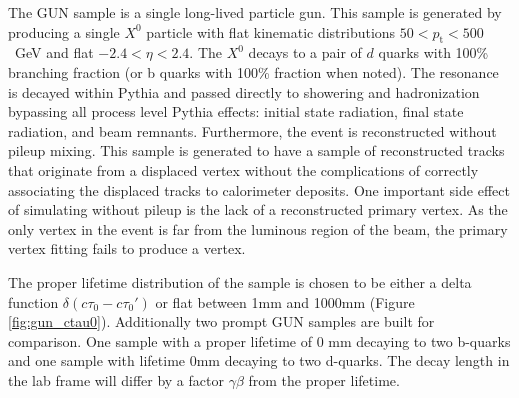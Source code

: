 The GUN sample is a single long-lived particle gun. 
This sample is generated by producing a single $X^0$ particle with flat kinematic distributions $50 < p_{\textrm{t}} < 500$~GeV and 
flat $-2.4< \eta < 2.4$. The $X^{0}$ decays to a pair of $d$ quarks with 100\% branching fraction
(or b quarks with 100\% fraction when noted). The resonance is decayed within Pythia and passed directly to
showering and hadronization bypassing all process level Pythia effects: initial
state radiation, final state radiation, and beam remnants. Furthermore, the event is reconstructed without pileup mixing. This sample
is generated to have a sample of reconstructed tracks that originate from a displaced vertex without the complications of correctly associating
the displaced tracks to calorimeter deposits. One important side effect of simulating without pileup is the lack of a reconstructed primary vertex. 
As the only vertex in the event is far from the luminous region of the beam, the primary vertex fitting fails to produce a vertex.

The proper lifetime distribution of the sample is chosen to be either a delta function $\delta(c\tau_0 - c\tau_0')$ or 
flat between 1mm and 1000mm (Figure \ref{fig:gun_ctau0}). Additionally two prompt GUN samples are built for comparison.
One sample with a proper lifetime of 0 mm decaying to two b-quarks and one sample with lifetime 0mm decaying to two d-quarks. The decay length 
in the lab frame will differ by a factor $\gamma\beta$ from the proper lifetime. 



